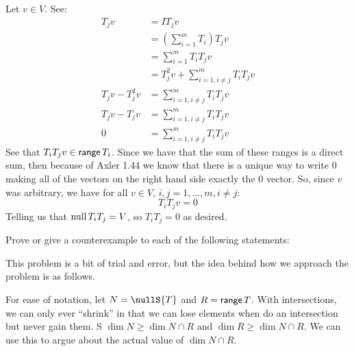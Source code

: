 \documentclass[answers]{exam}
\renewcommand{\L}[1]{\mathcal{L}\left(#1\right)}
\begin{document}
\begin{questions}
\begin{parts}
\begin{solution}
            Let $v\in V$. See:
            \begin{align*}
                T_jv &= IT_jv \\
                     &= \left(\sum_{i=1}^mT_i\right)T_jv \\
                     &= \sum_{i=1}^mT_iT_jv \\
                     &= T_j^2v + \sum_{i=1,i\neq j}^mT_iT_jv \\
                T_jv - T_j^2v &= \sum_{i=1,i\neq j}^mT_iT_jv\\
                T_jv - T_jv &= \sum_{i=1,i\neq j}^mT_iT_jv\\
                0 &= \sum_{i=1,i\neq j}^mT_iT_jv
            \end{align*}
            See that $T_iT_jv\in\mathsf{range}\,{T_i}$. Since we have that the sum of these ranges is a direct sum, then
            because of Axler 1.44 we know that there is a unique way to write $0$ making all of the vectors
            on the right hand side exactly the $0$ vector. So, since $v$ was arbitrary, we have for all $v\in V$,
            $i,j=1,\dots,m,i\neq j$:
            \[
                T_iT_jv = 0
            \]
            Telling us that $\text{null}\,{T_iT_j} = V$, so $T_iT_j=0$ as desired.
        \end{solution}
    \end{parts}
    \question Prove or give a counterexample to each of the following statements:
    \begin{solution}
        
         This problem is a bit of trial and error, but the idea behind how we approach the 
        problem is as follows. 

        For ease of notation, let $N = \nullS{T}$ and $R = \mathsf{range}\,{T}$. With intersections,
        we can only ever ``shrink'' in that we can lose elements when do an intersection but never gain them. S
        $\dim{N}\geq \dim{N\cap R}$ and $\dim{R}\geq \dim{N\cap R}$. We can use this to argue about the actual value 
        of $\dim{N\cap R}$.


\end{solution}
\end{questions}
\end{document}

